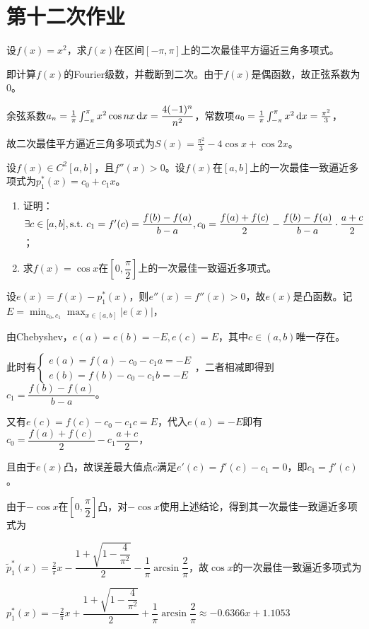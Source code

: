 \chapter{第十二次作业}

    \begin{homework}[5pts]
        设$f(x)=x^2$，求$f(x)$在区间$[-\pi,\pi]$上的二次最佳平方逼近三角多项式。
    \end{homework}

    \begin{solution}
        即计算$f(x)$的Fourier级数，并截断到二次。由于$f(x)$是偶函数，故正弦系数为0。

        余弦系数$a_n=\frac1{\pi}\int_{-\pi}^{\pi}x^2\cos nx \mathop{}\!\mathrm{d} x=\dfrac{4(-1)^n}{n^2}$，常数项$a_0=\frac1{\pi}\int_{-\pi}^{\pi}x^2\mathop{}\!\mathrm{d} x=\frac{\pi^2}{3}$，

        故二次最佳平方逼近三角多项式为$S(x)=\frac{\pi^2}3-4\cos x+\cos 2x$。
    \end{solution}

    \begin{homework}[10pts]
        设$f(x)\in C^2[a,b]$，且$f''(x)>0$。设$f(x)$在$[a,b]$上的一次最佳一致逼近多项式为$p_1^*(x)=c_0+c_1 x$。
        \begin{enumerate}
            \item 证明：$\exists c\in[a,b],\text{s.t.\,\,} c_1=f'(c)=\dfrac{f(b)-f(a)}{b-a},c_0=\dfrac{f(a)+f(c)}{2}-\dfrac{f(b)-f(a)}{b-a}\cdot\dfrac{a+c}{2}$；
            \item 求$f(x)=\cos x$在$\left[0,\dfrac{\pi}{2}\right]$上的一次最佳一致逼近多项式。
        \end{enumerate}
    \end{homework}

    \begin{solution}
        设$e(x)=f(x)-p_1^*(x)$，则$e''(x)=f''(x)>0$，故$e(x)$是凸函数。记$E=\min_{c_0,c_1}\max_{x\in[a,b]}|e(x)|$，

        由Chebyshev，$e(a)=e(b)=-E,e(c)=E$，其中$c\in(a,b)$唯一存在。

        此时有$\begin{cases}e(a)=f(a)-c_0-c_1 a=-E\\e(b)=f(b)-c_0-c_1 b=-E\end{cases}$，二者相减即得到$c_1=\dfrac{f(b)-f(a)}{b-a}$。

        又有$e(c)=f(c)-c_0-c_1 c=E$，代入$e(a)=-E$即有$c_0=\dfrac{f(a)+f(c)}{2}-c_1\dfrac{a+c}{2}$，

        且由于$e(x)$凸，故误差最大值点$c$满足$e'(c)=f'(c)-c_1=0$，即$c_1=f'(c)$。

        由于$-\cos x$在$[0,\dfrac{\pi}2]$凸，对$-\cos x$使用上述结论，得到其一次最佳一致逼近多项式为

        $\tilde{p}_1^*(x)=\frac2{\pi}x-\dfrac{1+\sqrt{1-\dfrac{4}{\pi^2}}}2-\dfrac1{\pi}\arcsin \dfrac2{\pi}$，故$\cos x$的一次最佳一致逼近多项式为

        $p_1^*(x)=-\frac2{\pi}x+\dfrac{1+\sqrt{1-\dfrac{4}{\pi^2}}}2+\dfrac1{\pi}\arcsin \dfrac2{\pi}\approx -0.6366x+1.1053$
    \end{solution}

